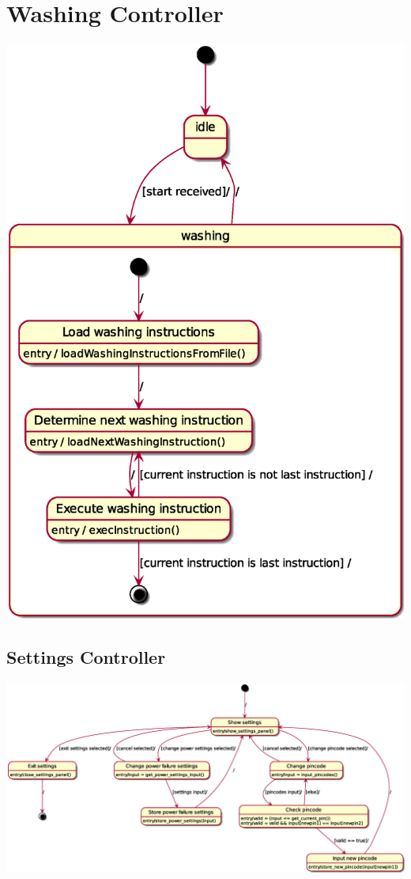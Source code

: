 \section{Washing Controller}
\includegraphics[scale=0.4]{washing_controller.eps}

\begin{landscape}
\thispagestyle{empty}
\section{Settings Controller}
\includegraphics[scale=0.5]{settings_controller.eps}
\end{landscape}